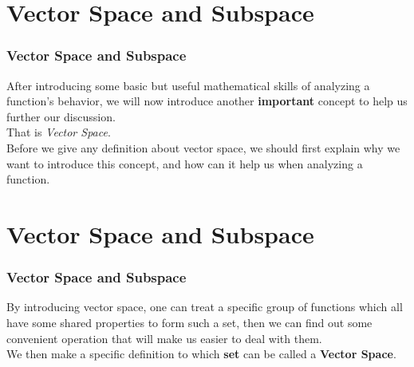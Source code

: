 \documentclass[12pt, t]{beamer}
\renewcommand{\emph}[1]{{\color{Turquoise3}\textsl{#1}}}
\begin{document}
\section{Vector Space and Subspace}
\begin{frame}
    \frametitle{Vector Space and Subspace}

After introducing some basic but useful mathematical skills of analyzing a function's behavior, we will now introduce another 
\textbf{important} concept to help us further our discussion. \\

\vspace{1em}
That is \emph{Vector Space}.\\

\vspace{1em}
\hspace{1em}
Before we give any definition about vector space, we should first explain why we want to introduce this concept, and how can it help us  
when analyzing a function.

\end{frame}

\section{Vector Space and Subspace}
\begin{frame}
    \frametitle{Vector Space and Subspace}

By introducing vector space, one can treat a specific group of functions which all have some shared properties to form such a set, then 
we can find out some convenient operation that will make us easier to deal with them.\\
\vspace{1em}
\hspace{1em}
We then make a specific definition to which \textbf{set} can be called a \textbf{Vector Space}.
    
\end{frame}
\end{document}
